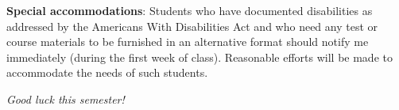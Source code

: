 \documentclass[12pt,twoside]{amsart}
\begin{document}
\textbf{Special accommodations}: Students who have documented disabilities as addressed by the Americans With Disabilities Act and who need any test or course materials to be furnished in an alternative format should notify me immediately (during the first week of class).  Reasonable efforts will be made to accommodate the needs of such students.

\vspace*{1ex}

\begin{center}
\emph{ {\LARGE Good luck this semester!} }
\end{center}
\end{document}
